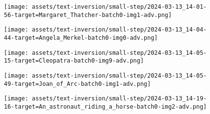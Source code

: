 \begin{figure*}[h]
\vspace{1ex}
\begin{minipage}[t]{.025\textwidth}
     \vspace{0pt}
\end{minipage}%
\hspace{1ex}
\begin{minipage}[t]{0.98\figwidth}
    \vspace{0pt}
    \begin{subfigure}[t]{0.2\textwidth}
        \texttt{[image: assets/text-inversion/small-step/2024-03-13\_14-01-56-target=Margaret\_Thatcher-batch0-img1-adv.png]}
    \end{subfigure}%
    \begin{subfigure}[t]{0.2\textwidth}
        \texttt{[image: assets/text-inversion/small-step/2024-03-13\_14-04-44-target=Angela\_Merkel-batch0-img0-adv.png]}
    \end{subfigure}%
    \begin{subfigure}[t]{0.2\textwidth}
        \texttt{[image: assets/text-inversion/small-step/2024-03-13\_14-05-15-target=Cleopatra-batch0-img9-adv.png]}
    \end{subfigure}%
    \begin{subfigure}[t]{0.2\textwidth}
        \texttt{[image: assets/text-inversion/small-step/2024-03-13\_14-05-49-target=Joan\_of\_Arc-batch0-img1-adv.png]}
    \end{subfigure}%
    \begin{subfigure}[t]{0.2\textwidth}
        \texttt{[image: assets/text-inversion/small-step/2024-03-13\_14-19-16-target=An\_astronaut\_riding\_a\_horse-batch0-img2-adv.png]}
    \end{subfigure}%
\end{minipage}


\end{figure*}
